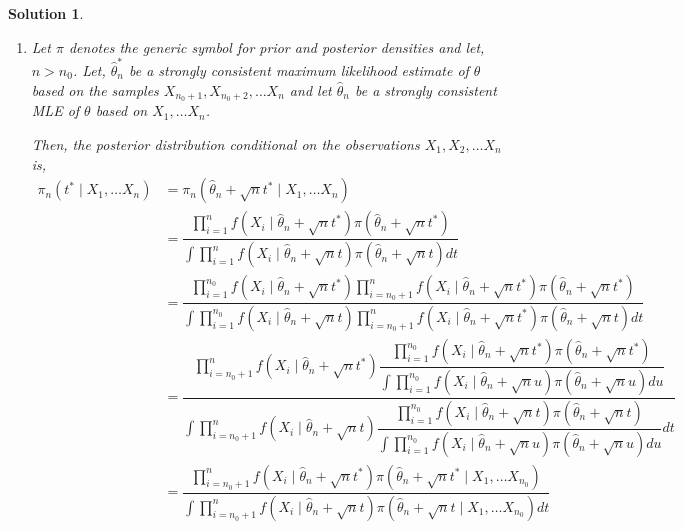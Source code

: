 \documentclass[12pt]{article}
\theoremstyle{problemstyle}
\newtheorem*{solution*}{Solution}
\begin{document}
\begin{solution*}
    \begin{enumerate}
        \item[(a)] Let $\pi$ denotes the generic symbol for prior and posterior densities and let, $n > n_0$. Let, $\widehat{\theta}_n^\ast$ be a strongly consistent maximum likelihood estimate of $\theta$ based on the samples $X_{n_0+1}, X_{n_0+2}, \dots X_n$ and let $\widehat{\theta}_n$ be a strongly consistent MLE of $\theta$ based on $X_1, \dots X_n$.
        
        Then, the posterior distribution conditional on the observations $X_1, X_2, \dots X_n$ is,
        \begin{align*}
            \pi_n(t^\ast \mid X_1, \dots X_n)
            & = \pi_n(\widehat{\theta}_n + \sqrt{n}t^\ast \mid X_1, \dots X_n)\\
            & = \dfrac{\prod_{i=1}^n f(X_i \mid \widehat{\theta}_n + \sqrt{n}t^\ast ) \pi(\widehat{\theta}_n + \sqrt{n}t^\ast) }{\int \prod_{i=1}^n f(X_i \mid \widehat{\theta}_n + \sqrt{n}t ) \pi(\widehat{\theta}_n + \sqrt{n}t) dt }\\
            & = \dfrac{\prod_{i=1}^{n_0} f(X_i \mid \widehat{\theta}_n + \sqrt{n}t^\ast ) \prod_{i=n_0+1}^{n} f(X_i \mid \widehat{\theta}_n + \sqrt{n}t^\ast ) \pi(\widehat{\theta}_n + \sqrt{n}t^\ast) }{\int \prod_{i=1}^{n_0} f(X_i \mid \widehat{\theta}_n + \sqrt{n}t ) \prod_{i=n_0+1}^{n} f(X_i \mid \widehat{\theta}_n + \sqrt{n}t^\ast ) \pi(\widehat{\theta}_n + \sqrt{n}t) dt }\\
            & = \dfrac{\prod_{i=n_0+1}^{n} f(X_i \mid \widehat{\theta}_n + \sqrt{n}t^\ast ) \dfrac{\prod_{i=1}^{n_0} f(X_i \mid \widehat{\theta}_n + \sqrt{n}t^\ast ) \pi(\widehat{\theta}_n + \sqrt{n}t^\ast)}{ \int \prod_{i=1}^{n_0} f(X_i \mid \widehat{\theta}_n + \sqrt{n}u ) \pi(\widehat{\theta}_n + \sqrt{n}u) du } }{\displaystyle\int \prod_{i=n_0 + 1}^{n} f(X_i \mid \widehat{\theta}_n + \sqrt{n}t ) \dfrac{\prod_{i=1}^{n_0} f(X_i \mid \widehat{\theta}_n + \sqrt{n}t ) \pi(\widehat{\theta}_n + \sqrt{n}t)}{\int \prod_{i=1}^{n_0} f(X_i \mid \widehat{\theta}_n + \sqrt{n}u ) \pi(\widehat{\theta}_n + \sqrt{n}u) du } dt }\\
            & = \dfrac{\prod_{i=n_0+1}^{n} f(X_i \mid \widehat{\theta}_n + \sqrt{n}t^\ast ) \pi(\widehat{\theta}_n + \sqrt{n} t^\ast \mid X_1, \dots X_{n_0} ) }{ \int \prod_{i=n_0+1}^{n} f(X_i \mid \widehat{\theta}_n + \sqrt{n}t ) \pi(\widehat{\theta}_n + \sqrt{n} t \mid X_1, \dots X_{n_0} ) dt}\\
        \end{align*}


\end{enumerate}
\end{solution*}
\end{document}
